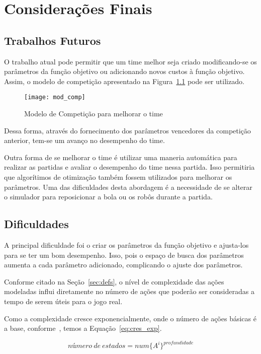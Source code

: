\chapter{Considerações Finais}\label{cap:cons_finais}

\section{Trabalhos Futuros}

O trabalho atual pode permitir que um time melhor
seja criado modificando-se os parâmetros da função
objetivo ou adicionando novos custos à função objetivo.
Assim, o modelo de competição apresentado na
Figura~\ref{fig:mod_comp} pode ser utilizado.

\begin{figure}[H]
  \centering
  \texttt{[image: mod\_comp]}
  \caption{Modelo de Competição para melhorar
           o time}\label{fig:mod_comp}
\end{figure}

Dessa forma, através do fornecimento dos parâmetros
vencedores da competição anterior, tem-se um avanço
no desempenho do time.

Outra forma de se melhorar o time é utilizar uma
maneria automática para realizar as partidas e
avaliar o desempenho do time nessa partida. Isso
permitiria que algorítimos de otimização também
fossem utilizados para melhorar os parâmetros.
Uma das dificuldades desta abordagem é a necessidade
de se alterar o simulador para reposicionar a bola
ou os robôs durante a partida.
 
\section{Dificuldades}

A principal dificuldade foi o criar os parâmetros da função objetivo
e ajusta-los para se ter um bom desempenho. Isso, pois o espaço
de busca dos parâmetros aumenta a cada parâmetro adicionado, complicando
o ajuste dos parâmetros.

Conforme citado na Seção~\ref{sec:defs}, o nível de complexidade das ações
modeladas influi diretamente no número de
ações que poderão ser consideradas a tempo de serem úteis para o jogo real.

Como a complexidade cresce exponencialmente, onde o número de ações básicas é
a base, conforme~\cite{russell2003artificial}, temos a Equação~\ref{eq:cres_exp}.

\begin{dmath}\label{eq:cres_exp}
 número{\ }de{\ }estados = num \lbrace A^i \rbrace ^{profundidade}
\end{dmath}

